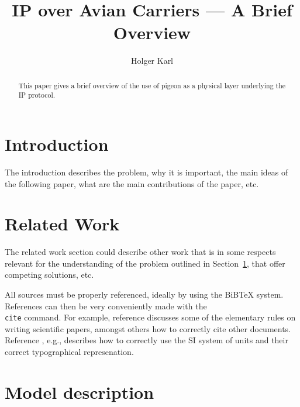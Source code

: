 \documentclass[12pt,twoside,doublepage]{article}
\newcommand{\teilnehmer}{Holger Karl}
\newcommand{\ausarbeitung}{IP over Avian Carriers --- A Brief
  Overview}
\begin{document}
\title{\ausarbeitung}
\author{\teilnehmer}
\maketitle
\thispagestyle{empty}



\begin{abstract}
  This paper gives a brief overview of the use of pigeon as a physical
  layer underlying  the IP protocol. 
\end{abstract}


\section{Introduction}
\label{sec:introduction}

The introduction describes the problem, why it is important, the main
ideas of the following paper, what are the main contributions of the
paper, etc. 

\section{Related Work}
\label{sec:relwork}

The related work section could describe other work that is in some
respects relevant for the understanding of the problem outlined in
Section~\ref{sec:introduction}, that offer competing solutions, etc.

All sources must be properly referenced, ideally by using the BiBTeX
system. References can then be very conveniently made with the
\texttt{\\cite} command. For example, reference
\cite{leuwen00:_handb_schol} discusses some of the elementary rules on
writing scientific papers, amongst others how to correctly cite other
documents. Reference \cite{Taylor:SIGuide:95}, e.g., describes how to
correctly use the SI system of units and their correct typographical
represenation.


\section{Model description}
\label{sec:model}
\end{document}
